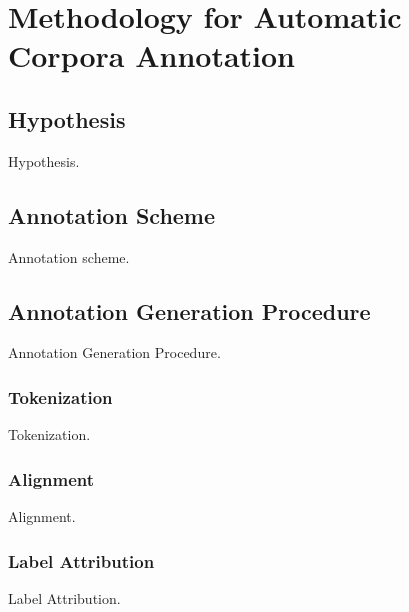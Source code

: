 
\chapter{Methodology for Automatic Corpora Annotation}

\section{Hypothesis}

Hypothesis.

\section{Annotation Scheme}

Annotation scheme.

\section{Annotation Generation Procedure}

Annotation Generation Procedure.

\subsection{Tokenization}

Tokenization.

\subsection{Alignment}

Alignment.

\subsection{Label Attribution}

Label Attribution.